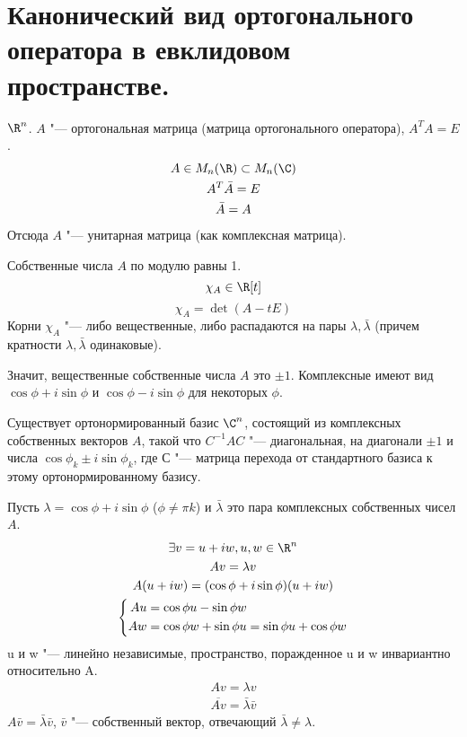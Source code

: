﻿\section{Канонический вид ортогонального оператора в евклидовом пространстве.}

$\R^n$.
$A$ "--- ортогональная матрица (матрица ортогонального оператора), $A^TA = E$.
\begin{gather*}
	A \in M_n(\R) \subset M_n(\C) \\
	A^{T}\bar A = E \\
	\bar A = A
\end{gather*}
Отсюда $A$ "--- унитарная матрица (как комплексная матрица).

Собственные числа $A$ по модулю равны 1.
\[ \chi_A \in \R[t] \]
$$\chi_A = \det(A - tE)$$
Корни $\chi_A$ "--- либо вещественные, либо
распадаются на пары $\lambda, \bar \lambda$ (причем кратности $\lambda, \bar \lambda$ одинаковые).

Значит, вещественные собственные числа $A$ это $\pm 1$.
Комплексные имеют вид $\cos \phi + i \sin \phi$ и $\cos \phi - i \sin \phi$ для некоторых $\phi$.

Существует ортонормированный базис $\C^n$, состоящий из комплексных собственных векторов $A$,
такой что $C^{-1}AC$ "--- диагональная, на диагонали $\pm 1$ и числа $\cos \phi_k \pm i \sin \phi_k$,
где $С$ "--- матрица перехода от стандартного базиса к этому ортонормированному базису.

Пусть $\lambda = \cos \phi + i \sin \phi$ ($\phi \ne \pi k$) и $\bar \lambda$ это пара комплексных собственных чисел $A$.
\begin{gather*}
	\exists v = u + iw, u, w\in \R^n \\
	Av = \lambda v \\
	A(u + iw) = (\cos \phi + i \sin \phi)(u + iw) \\
	\left\{\begin{aligned}
		Au &= \cos \phi u - \sin \phi w \\
		Aw &= \cos \phi w + \sin \phi u = \sin \phi u + \cos \phi w
	\end{aligned}\right.\\
\end{gather*}
u и w "--- линейно независимые, пространство, поражденное u и w инвариантно относительно A.
\begin{gather*}	
	Av = \lambda v \\
	\overline{Av} = \bar\lambda \bar v
\end{gather*}
$A \bar v = \bar\lambda \bar v$, $\bar v$ "--- собственный вектор, отвечающий $\bar \lambda \ne \lambda$.

